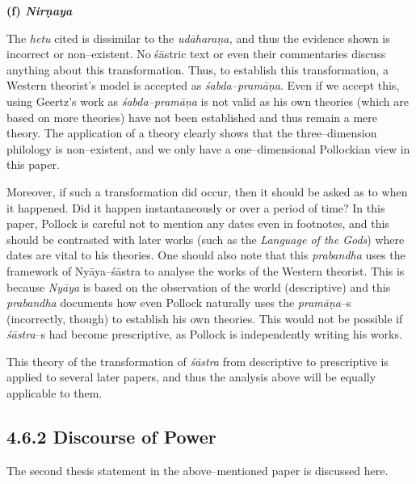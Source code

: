 \textbf{(f) \textit{Nirṇaya}}

The \textit{hetu} cited is dissimilar to the\textit{ udāharaṇa, }and thus the evidence shown is incorrect or non–existent. No śāstric text or even their commentaries discuss anything about this transformation. Thus, to establish this transformation, a Western theorist’s model is accepted as \textit{śabda–pramāṇa}. Even if we accept this, using Geertz’s work as \textit{śabda–pramāṇa} is not valid as his own theories (which are based on more theories) have not been established and thus remain a mere theory. The application of a theory clearly shows that the three–dimension philology is non–existent, and we only have a one–dimensional Pollockian view in this paper.

Moreover, if such a transformation did occur, then it should be asked as to when it happened. Did it happen instantaneously or over a period of time? In this paper, Pollock is careful not to mention any dates even in footnotes, and this should be contrasted with later works (such as the \textit{Language of the Gods}) where dates are vital to his theories. One should also note that this \textit{prabandha} uses the framework of Nyāya–śāstra to analyse the works of the Western theorist. This is because \textit{Nyāya }is based on the observation of the world (descriptive) and this \textit{prabandha} documents how even Pollock naturally uses the \textit{pramāṇa}–s (incorrectly, though) to establish his own theories. This would not be possible if \textit{śāstra}–s had become prescriptive, as Pollock is independently writing his works.

This theory of the transformation of \textit{śāstra }from descriptive to prescriptive is applied to several later papers, and thus the analysis above will be equally applicable to them.

\vspace{-.3cm}

\subsection*{4.6.2 Discourse of Power}

\vspace{-.2cm}

The second thesis statement in the above–mentioned paper is discussed here.

